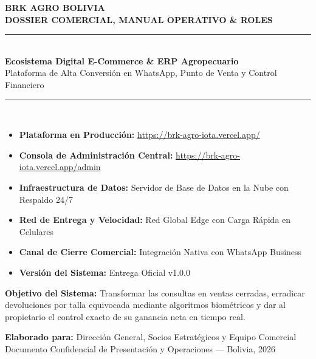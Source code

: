 \documentclass[11pt,a4paper]{article}
\begin{document}
\begin{titlepage}
    \centering
    \vspace*{0.5cm}
    
    {\Huge\textbf{\color{AgroGreenDark}BRK AGRO BOLIVIA}}\\[0.35cm]
    {\Large\textbf{\color{AgroGold}DOSSIER COMERCIAL, MANUAL OPERATIVO \& ROLES}}\\[0.6cm]
    
    \rule{\linewidth}{1.5pt}\\[0.4cm]
    {\LARGE\textbf{Ecosistema Digital E-Commerce \& ERP Agropecuario}}\\[0.25cm]
    {\large Plataforma de Alta Conversión en WhatsApp, Punto de Venta y Control Financiero}\\[0.4cm]
    \rule{\linewidth}{1.5pt}\\[1.2cm]
    
    \begin{propbox}
        \begin{itemize}
            \item \textbf{Plataforma en Producción:} \url{https://brk-agro-iota.vercel.app/}
            \item \textbf{Consola de Administración Central:} \url{https://brk-agro-iota.vercel.app/admin}
            \item \textbf{Infraestructura de Datos:} Servidor de Base de Datos en la Nube con Respaldo 24/7
            \item \textbf{Red de Entrega y Velocidad:} Red Global Edge con Carga Rápida en Celulares
            \item \textbf{Canal de Cierre Comercial:} Integración Nativa con WhatsApp Business
            \item \textbf{Versión del Sistema:} Entrega Oficial v1.0.0
        \end{itemize}
    \end{propbox}

    \vfill
    
    \begin{highlightbox}
    \textbf{Objetivo del Sistema:} Transformar las consultas en ventas cerradas, erradicar devoluciones por talla equivocada mediante algoritmos biométricos y dar al propietario el control exacto de su ganancia neta en tiempo real.
    \end{highlightbox}

    \vspace{0.8cm}
    {\normalsize\textbf{Elaborado para:} Dirección General, Socios Estratégicos y Equipo Comercial}\\[0.2cm]
    {\small Documento Confidencial de Presentación y Operaciones --- Bolivia, 2026}
\end{titlepage}
\end{document}
